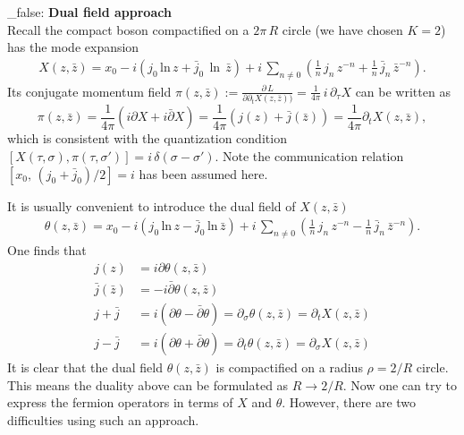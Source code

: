 \documentclass[submission, PhysLectNotes]{SciPost}
\begin{document}
\if_false:
{\bf Dual field approach}\\
Recall the compact boson compactified on a $2\pi\,R$ circle (we have chosen $K=2$) has the mode expansion
\begin{equation}
	\begin{split}
		X(z,\bar{z}) = x_0 -i\left(j_0\,\mathrm{ln}\,z + \bar{j}_0\,\ln\,\bar{z}\right) + i\,\sum_{n\neq0} \left(\frac{1}{n}\,j_n\,z^{-n}+\frac{1}{n}\,\bar{j}_n\,\bar{z}^{-n}\right).
	\end{split}
\end{equation} 
Its conjugate momentum field $\pi(z,\bar{z}):=\frac{\partial\,L}{\partial\partial_t X(z,\bar{z}))} = \frac{1}{4\pi}\,i\,\partial_\tau X$ can be written as
\begin{equation}
	\pi(z,\bar{z}) = \frac{1}{4\pi} \left(i\partial X + i\bar{\partial} X\right) = \frac{1}{4\pi} \left(j(z) + \bar{j}(\bar{z})\right) = \frac{1}{4\pi} \partial_t X(z,\bar{z}),
\end{equation}
which is consistent with the quantization condition $[X(\tau,\sigma),\pi (\tau,\sigma')] = i\,\delta(\sigma-\sigma')$. Note the communication relation $[x_0,\,\left(j_0+\bar{j}_0\right)/2] = i$ has been assumed here. 

It is usually convenient to introduce the dual field of $X(z,\bar{z})$
\begin{equation}
	\begin{split}
		\theta(z,\bar{z}) = x_0 -i\left(j_0\,\mathrm{ln}\,z - \bar{j}_0\,\mathrm{ln}\,\bar{z}\right) + i\,\sum_{n\neq0} \left(\frac{1}{n}\,j_n\,z^{-n}-\frac{1}{n}\,\bar{j}_n\,\bar{z}^{-n}\right).
	\end{split}
\end{equation} 
One finds that 
\begin{equation}
	\begin{split}
		j(z) &= i\partial\theta(z,\bar{z}) \\
		\bar{j}(\bar{z}) &= -i\bar{\partial}\theta(z,\bar{z})\\
		j+\bar{j} &= i\left(\partial\theta-\bar{\partial}\theta\right) = \partial_\sigma \theta(z,\bar{z}) = \partial_t X(z,\bar{z}) \\
		j-\bar{j} &= i\left(\partial\theta+\bar{\partial}\theta\right) = \partial_t \theta(z,\bar{z}) = \partial_\sigma X(z,\bar{z})
	\end{split}
\end{equation}
It is clear that the dual field $\theta(z,\bar{z})$ is compactified on a radius $\rho = 2/R$ circle. This means the duality above can be formulated as $R \rightarrow 2/R$. Now one can try to express the fermion operators in terms of $X$ and $\theta$. However, there are two difficulties using such an approach. 
\end{document}

